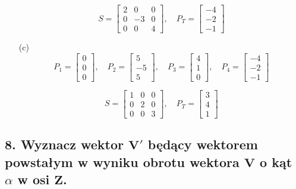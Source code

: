 \begin{enumerate}
    \[
    S = \begin{bmatrix} 2 & 0 & 0 \\ 0 & -3 & 0 \\ 0 & 0 & 4 \end{bmatrix}, 
    \quad P_T = \begin{bmatrix} -4 \\ -2 \\ -1 \end{bmatrix}
    \]

    \item[(c)] 
    \[
    P_1 = \begin{bmatrix} 0 \\ 0 \\ 0 \end{bmatrix}, 
    \quad P_2 = \begin{bmatrix} 5 \\ -5 \\ 5 \end{bmatrix}, 
    \quad P_3 = \begin{bmatrix} 4 \\ 1 \\ 0 \end{bmatrix}, 
    \quad P_4 = \begin{bmatrix} -4 \\ -2 \\ -1 \end{bmatrix}
    \]
    
    \[
    S = \begin{bmatrix} 1 & 0 & 0 \\ 0 & 2 & 0 \\ 0 & 0 & 3 \end{bmatrix}, 
    \quad P_T = \begin{bmatrix} 3 \\ 4 \\ 1 \end{bmatrix}
    \]
\end{enumerate}

\subsection*{8. Wyznacz wektor \( \mathbf{V'} \) będący wektorem powstałym w wyniku obrotu wektora \( \mathbf{V} \) o kąt \( \alpha \) w osi \( \mathbf{Z} \).}

